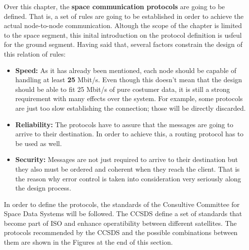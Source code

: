 Over this chapter, the \textbf{space communication protocols} are going to be defined. That is, a set of rules are going to be established in order to achieve the actual node-to-node communication. Altough the scope of the chapter is limited to the space segment, this inital introduction on the protocol definition is usfeul for the ground segment.
Having said that, several factors constrain the design of this relation of rules:

\begin{itemize}
\renewcommand{\labelitemi}{\scriptsize$\blacksquare$} 
\item \textbf{Speed:} As it has already been mentioned, each node should be capable of handling at least \textbf{25} Mbit/s. Even though this doesn't mean that the design should be able to fit 25 Mbit/s of pure costumer data, it is still a strong requirement with many effects over the system. For example, some protocols are just too slow establishing the connection; those will be directly discarded.

\item \textbf{Reliability:} The protocols have to assure that the messages are going to arrive to their destination. In order to achieve this, a routing protocol has to be used as well.


\item \textbf{Security:} Messages are not just required to arrive to their destination but they also must be ordered and coherent when they reach the client. That is the reason why error control is taken into consideration very seriously along the design process.
\end{itemize}
In order to define the protocols, the standards of the Consultive Committee for Space Data Systems will be followed. The CCSDS define a set of standards that become part of ISO and enhance operatibility between different satellites. The protocols recommended by the CCSDS and the possible combinations between them are shown in the Figures at the end of this section.
